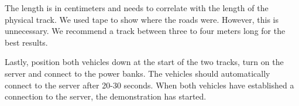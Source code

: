 The length is in centimeters and needs to correlate with the length of the physical track. We used tape to show where the roads were. However, this is unnecessary. We recommend a track between three to four meters long for the best results.

Lastly, position both vehicles down at the start of the two tracks, turn on the server and connect to the power banks. The vehicles should automatically connect to the server after 20-30 seconds. When both vehicles have established a connection to the server, the demonstration has started.